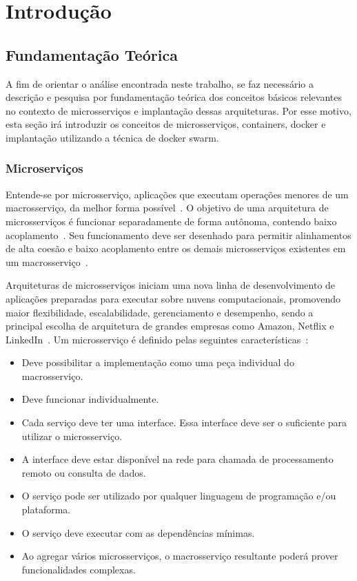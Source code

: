 \chapter{Introdução}
\label{cap1}


\section{Fundamentação Teórica}


A fim de orientar o análise encontrada neste trabalho, se faz necessário a descrição e pesquisa por fundamentação teórica dos conceitos básicos relevantes no contexto de microsserviços e implantação dessas arquiteturas.
%
Por esse motivo, esta seção irá introduzir os conceitos de microsserviços, containers, docker e implantação utilizando a técnica de docker swarm.


\subsection{Microserviços}

Entende-se por microsserviço, aplicações que executam operações menores de um macrosserviço, da melhor forma possível~\cite{stephenclarkewillson2017, Newman2015Feb}.
%
O objetivo de uma arquitetura de microsserviços é funcionar separadamente de forma autônoma, contendo baixo acoplamento~\cite{Newman2015Feb}.
%
Seu funcionamento deve ser desenhado para permitir alinhamentos de alta coesão e baixo acoplamento entre os demais microsserviços existentes em um macrosserviço~\cite{8169955}.



Arquiteturas de microsserviços iniciam uma nova linha de desenvolvimento de aplicações preparadas para executar sobre nuvens computacionais, promovendo maior flexibilidade, escalabilidade, gerenciamento e desempenho, sendo a principal escolha de arquitetura de grandes empresas como Amazon, Netflix e LinkedIn~\cite{7830692,7515686}.
%
Um microsserviço é definido pelas seguintes características~\cite{8169955}:



\begin{itemize}
  \item Deve possibilitar a implementação como uma peça individual do macrosserviço.
  \item Deve funcionar individualmente.
  \item Cada serviço deve ter uma interface. Essa interface deve ser o suficiente para utilizar o microsserviço.
  \item A interface deve estar disponível na rede para chamada de processamento remoto ou consulta de dados.
  \item O serviço pode ser utilizado por qualquer linguagem de programação e/ou plataforma.
  \item O serviço deve executar com as dependências mínimas.
  \item Ao agregar vários microsserviços, o macrosserviço resultante poderá prover funcionalidades complexas.
\end{itemize}



